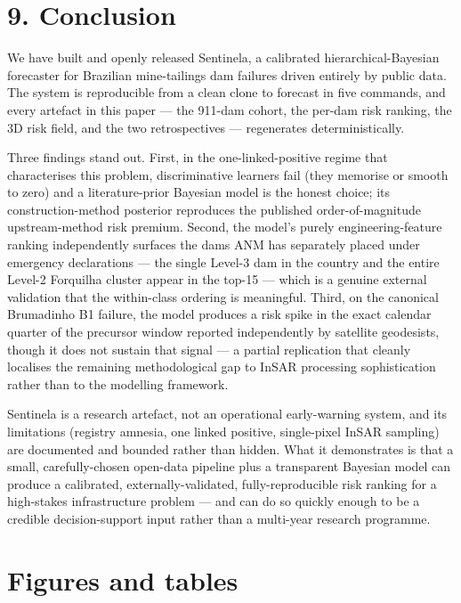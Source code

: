\documentclass[
  11pt]{article}
\begin{document}
\section{9. Conclusion}\label{conclusion}

We have built and openly released Sentinela, a calibrated
hierarchical-Bayesian forecaster for Brazilian mine-tailings dam
failures driven entirely by public data. The system is reproducible from
a clean clone to forecast in five commands, and every artefact in this
paper --- the 911-dam cohort, the per-dam risk ranking, the 3D risk
field, and the two retrospectives --- regenerates deterministically.

Three findings stand out. First, in the one-linked-positive regime that
characterises this problem, discriminative learners fail (they memorise
or smooth to zero) and a literature-prior Bayesian model is the honest
choice; its construction-method posterior reproduces the published
order-of-magnitude upstream-method risk premium. Second, the model's
purely engineering-feature ranking independently surfaces the dams ANM
has separately placed under emergency declarations --- the single
Level-3 dam in the country and the entire Level-2 Forquilha cluster
appear in the top-15 --- which is a genuine external validation that the
within-class ordering is meaningful. Third, on the canonical Brumadinho
B1 failure, the model produces a risk spike in the exact calendar
quarter of the precursor window reported independently by satellite
geodesists, though it does not sustain that signal --- a partial
replication that cleanly localises the remaining methodological gap to
InSAR processing sophistication rather than to the modelling framework.

Sentinela is a research artefact, not an operational early-warning
system, and its limitations (registry amnesia, one linked positive,
single-pixel InSAR sampling) are documented and bounded rather than
hidden. What it demonstrates is that a small, carefully-chosen open-data
pipeline plus a transparent Bayesian model can produce a calibrated,
externally-validated, fully-reproducible risk ranking for a high-stakes
infrastructure problem --- and can do so quickly enough to be a credible
decision-support input rather than a multi-year research programme.

\section{Figures and tables}\label{figures-and-tables}
\end{document}

